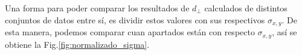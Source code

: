 
    


    Una forma  para poder comparar los resultados de $d_\perp$ calculados de distintos conjuntos de  datos entre sí, es dividir estos valores con  sus respectivos $\sigma_{x,y}$. De esta manera, podemos comparar cuan apartados están con respecto $\sigma_{x,y}$, así se obtiene la Fig.\ref{fig:normalizado_sigma}.

